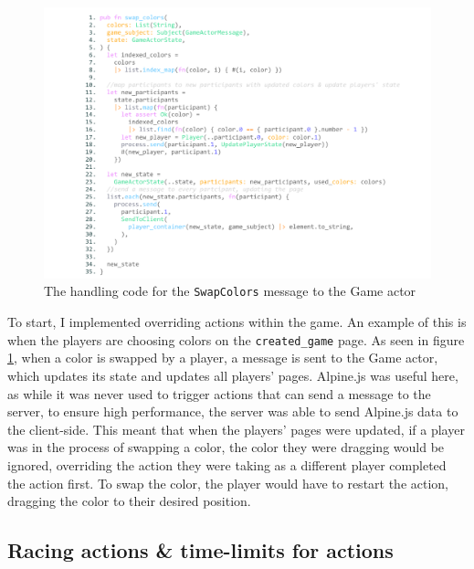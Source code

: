 \documentclass[]{final}
\begin{document}
\begin{figure}[H]
  \centering
  \includegraphics[width=\textwidth]{swap_colors.pdf}
  \caption{The handling code for the \lstinline|SwapColors| message to the Game actor}\label{fig: swapcolors}
\end{figure}

To start, I implemented overriding actions within the game. An example of this
is when the players are choosing colors on the \lstinline|created_game| page.
As seen in figure \ref{fig: swapcolors}, when
a color is swapped by a player, a message is sent to the Game actor, which
updates its state and updates all players' pages. Alpine.js was useful here,
as while it was never used to trigger actions that can send a message to the
server, to ensure high performance, the server was able to send Alpine.js data
to the client-side. This meant that when the players' pages were updated,
if a player was in the process of swapping a color, the color they were dragging
would be ignored, overriding the action they were taking as a different player
completed the action first. To swap the color, the player would have to restart
the action, dragging the color to their desired position.

\newpage

\subsection{Racing actions \& time-limits for actions}
\end{document}
